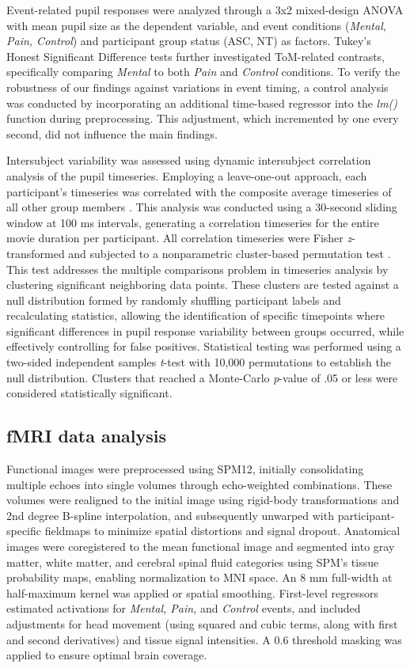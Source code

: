 Event-related pupil responses were analyzed through a 3x2 mixed-design ANOVA with mean pupil size as the dependent variable, and event conditions (\textit{Mental, Pain, Control}) and participant group status (ASC, NT) as factors. Tukey's Honest Significant Difference tests further investigated ToM-related contrasts, specifically comparing \textit{Mental} to both \textit{Pain} and \textit{Control} conditions. To verify the robustness of our findings against variations in event timing, a control analysis was conducted by incorporating an additional time-based regressor into the \textit{lm()} function during preprocessing. This adjustment, which incremented by one every second, did not influence the main findings.

Intersubject variability was assessed using dynamic intersubject correlation analysis of the pupil timeseries. Employing a leave-one-out approach, each participant's timeseries was correlated with the composite average timeseries of all other group members \citep{nastase2019}. This analysis was conducted using a 30-second sliding window at 100 ms intervals, generating a correlation timeseries for the entire movie duration per participant. All correlation timeseries were Fisher \textit{z}-transformed and subjected to a nonparametric cluster-based permutation test \citep{maris2007}. This test addresses the multiple comparisons problem in timeseries analysis by clustering significant neighboring data points. These clusters are tested against a null distribution formed by randomly shuffling participant labels and recalculating statistics, allowing the identification of specific timepoints where significant differences in pupil response variability between groups occurred, while effectively controlling for false positives. Statistical testing was performed using a two-sided independent samples \textit{t}-test with 10,000 permutations to establish the null distribution. Clusters that reached a Monte-Carlo \textit{p}-value of .05 or less were considered statistically significant.

\subsection{fMRI data analysis}
Functional images were preprocessed using SPM12, initially consolidating multiple echoes into single volumes through echo-weighted combinations. These volumes were realigned to the initial image using rigid-body transformations and 2nd degree B-spline interpolation, and subsequently unwarped with participant-specific fieldmaps to minimize spatial distortions and signal dropout. Anatomical images were coregistered to the mean functional image and segmented into gray matter, white matter, and cerebral spinal fluid categories using SPM's tissue probability maps, enabling normalization to MNI space. An 8 mm full-width at half-maximum kernel was applied or spatial smoothing. First-level regressors estimated activations for \textit{Mental, Pain,} and \textit{Control} events, and included adjustments for head movement (using squared and cubic terms, along with first and second derivatives) and tissue signal intensities. A 0.6 threshold masking was applied to ensure optimal brain coverage.

